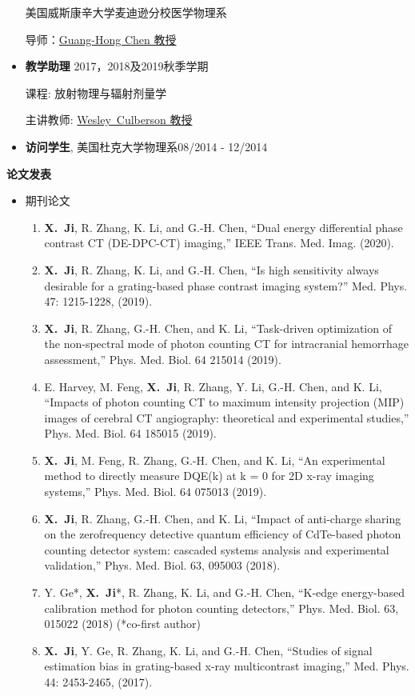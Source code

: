\documentclass[letterpaper,11pt]{article}
\newcommand{\resheading}[1]{{\large \colorbox{mygrey}{\begin{minipage}{\textwidth}{\textbf{#1 \vphantom{p\^{E}}}}\end{minipage}}}}
\newcommand{\profchen}{\href{https://www.medphysics.wisc.edu/blog/staff/chen-guanghong/} {Guang-Hong Chen 教授}}
\newcommand{\profculberson}{\href{https://www.medphysics.wisc.edu/blog/staff/culberson-wesley/} {Wesley~Culberson 教授}}
\newcommand{\xji}{\textbf{X.~Ji}}
\begin{document}
\begin{CJK}{UTF8}{song}
\begin{itemize}
美国威斯康辛大学麦迪逊分校医学物理系

导师：\profchen
\item \textbf{教学助理} \cftdotfill{\cftdotsep} 2017，2018及2019秋季学期

课程: 放射物理与辐射剂量学

主讲教师: \profculberson
	 \item \textbf{访问学生}, 美国杜克大学物理系\cftdotfill{\cftdotsep}08/2014 - 12/2014
\end{itemize}
\resheading{论文发表}
\begin{itemize}
\item 期刊论文
\begin{enumerate}\justifying
\item \xji, R. Zhang, K. Li, and G.-H. Chen, ``Dual energy differential phase contrast CT (DE-DPC-CT) imaging,'' IEEE Trans. Med. Imag. (2020).
\item \xji, R. Zhang, K. Li, and G.-H. Chen, ``Is high sensitivity always desirable for a grating-based phase contrast imaging system?'' Med. Phys. 47: 1215-1228, (2019).
\item \xji, R. Zhang, G.-H. Chen, and K. Li, ``Task-driven optimization of the non-spectral mode of photon counting CT for intracranial hemorrhage assessment,'' Phys. Med. Biol. 64 215014 (2019).
\item E. Harvey, M. Feng, \xji, R. Zhang, Y. Li, G.-H. Chen, and K. Li, ``Impacts of photon counting CT to maximum intensity projection (MIP) images of cerebral CT angiography: theoretical and experimental studies,'' Phys. Med. Biol. 64 185015 (2019).
\item \xji, M. Feng, R. Zhang, G.-H. Chen, and K. Li, ``An experimental method to directly measure DQE(k) at k = 0 for 2D x-ray imaging systems,'' Phys. Med. Biol. 64 075013 (2019).
\item \xji, R. Zhang, G.-H. Chen, and K. Li, ``Impact of anti-charge sharing on the zerofrequency detective quantum efficiency of CdTe-based photon counting detector system: cascaded systems analysis and experimental validation,'' Phys. Med. Biol. 63, 095003 (2018).
\item Y. Ge*, \xji*, R. Zhang, K. Li, and G.-H. Chen, ``K-edge energy-based calibration method for photon counting detectors,'' Phys. Med. Biol. 63, 015022 (2018) (*co-first author)
\item \xji, Y. Ge, R. Zhang, K. Li, and G.-H. Chen, ``Studies of signal estimation bias in grating-based x-ray multicontrast imaging,'' Med. Phys. 44: 2453-2465, (2017).
\end{enumerate}


\end{itemize}
\end{CJK}
\end{document}
